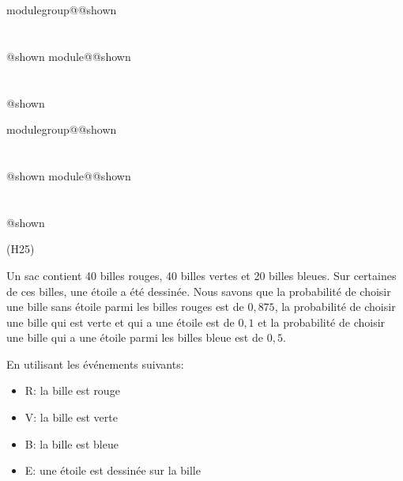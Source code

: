 \documentclass{Evaluation}
\makeatletter
\newcommand{\currentmodulekey}{}
\newcommand{\currentmoduletitle}{}
\newcommand{\currentgroupkey}{}
\newcommand{\currentgrouptitle}{}
\newcommand{\showmoduleifneeded}{%
  \ifx\currentgroupkey\empty\else
    \expandafter\ifx\csname modulegroup@\currentgroupkey @shown\endcsname\relax
      \section*{\currentgrouptitle}%
      \expandafter\gdef\csname modulegroup@\currentgroupkey @shown\endcsname{1}%
    \fi
  \fi
  \expandafter\ifx\csname module@\currentmodulekey @shown\endcsname\relax
    \section*{\currentmoduletitle}%
    \expandafter\gdef\csname module@\currentmodulekey @shown\endcsname{1}%
  \fi
}
\newenvironment{H25}{\showmoduleifneeded}{}
\makeatother
\begin{document}
\begin{questions}
\begin{H25}
\end{H25}

\begin{H25}
\question
(H25) 

Un sac contient 40 billes rouges, 40 billes vertes et 20 billes bleues.
Sur certaines de ces billes, une étoile a été dessinée.
Nous savons que la probabilité de choisir une bille sans étoile parmi les billes rouges est de $0,875$, la probabilité de choisir une bille qui est verte et qui a une étoile est de $0,1$ et la probabilité de choisir une bille qui a une étoile parmi les billes bleue est de $0,5$.

En utilisant les événements suivants:

\begin{itemize}
    \item R: la bille est rouge
    \item V: la bille est verte
    \item B: la bille est bleue
    \item E: une étoile est dessinée sur la bille
\end{itemize}


\end{H25}
\end{questions}
\end{document}

